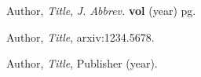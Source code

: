 \documentclass[a4paper,12pt]{article}
\begin{document}

\begin{thebibliography}{99}

Author, \emph{Title}, \emph{J. Abbrev.} {\bf vol} (year) pg.

Author, \emph{Title},
arxiv:1234.5678.

Author, \emph{Title},
Publisher (year).





\end{thebibliography}
\end{document}
